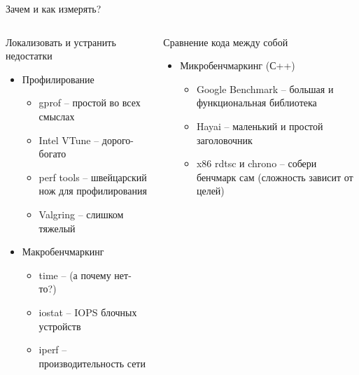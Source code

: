 \begin{frame}{Зачем и как измерять?}
	\begin{columns}
		\begin{column}{.5\textwidth}
				\begin{block}{Локализовать и устранить недостатки}
					\begin{itemize}
						\item Профилирование
						\begin{itemize}
							\item gprof -- простой во всех смыслах
							\item Intel VTune -- дорого-богато
							\item perf tools -- швейцарский нож для профилирования
							\item Valgring -- слишком тяжелый
						\end{itemize}
						\item Макробенчмаркинг
						\begin{itemize}
							\item time -- (а почему нет-то?)
							\item iostat -- IOPS блочных устройств
							\item iperf -- производительность сети
						\end{itemize}
					\end{itemize}
				\end{block}
		\end{column}
		\begin{column}{.5\textwidth}
			\begin{block}{Сравнение кода между собой}
				\begin{itemize}
					\item Микробенчмаркинг (С++)
					\begin{itemize}
						\item Google Benchmark -- большая и функциональная библиотека
						\item Hayai -- маленький и простой заголовочник
						\item x86 rdtsc и chrono -- собери бенчмарк сам (сложность зависит от целей)
					\end{itemize}
				\end{itemize}
			\end{block}
		\end{column}
	\end{columns}
\end{frame}


